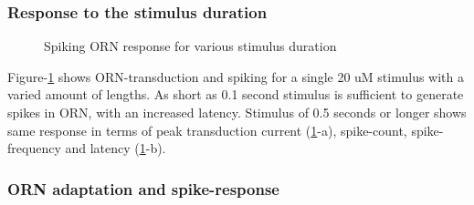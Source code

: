 \documentclass[
]{article}
\begin{document}
\hypertarget{response-to-the-stimulus-duration}{%
\subsubsection{Response to the stimulus duration}\label{response-to-the-stimulus-duration}}

\begin{figure}

{\centering {}

}

\caption{Spiking ORN response for various stimulus duration}\label{fig:rDur}
\end{figure}

Figure-\ref{fig:rDur} shows ORN-transduction and spiking for a single 20 uM stimulus with a varied amount of lengths. As short as 0.1 second stimulus is sufficient to generate spikes in ORN, with an increased latency. Stimulus of 0.5 seconds or longer shows same response in terms of peak transduction current (\ref{fig:rDur}-a), spike-count, spike-frequency and latency (\ref{fig:rDur}-b).

\clearpage

\hypertarget{orn-adaptation-and-spike-response}{%
\subsubsection{ORN adaptation and spike-response}\label{orn-adaptation-and-spike-response}}
\end{document}
